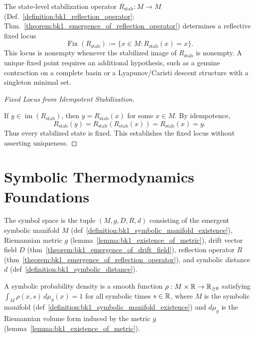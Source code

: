 \begin{corollary}
\label{corollary:bk1_fixed_point}
The state-level stabilization operator \(R_{\mathrm{stab}}:M\to M\)
(Def.~\ref{definition:bk1_reflection_operator};
Thm.~\ref{theorem:bk1_emergence_of_reflection_operator}) determines a reflective
fixed locus
\[
\operatorname{Fix}(R_{\mathrm{stab}})
  := \{x\in M : R_{\mathrm{stab}}(x)=x\}.
\]
This locus is nonempty whenever the stabilized image of \(R_{\mathrm{stab}}\) is
nonempty. A unique fixed point requires an additional hypothesis, such as a
genuine contraction on a complete basin or a Lyapunov/Caristi descent structure
with a singleton minimal set.

\begin{proof}[Fixed Locus from Idempotent Stabilization]
\label{proof:bk1_fixed_point_contraction_stability}
\leavevmode

If \(y\in \operatorname{im}(R_{\mathrm{stab}})\), then \(y=R_{\mathrm{stab}}(x)\)
for some \(x\in M\). By idempotence,
\[
R_{\mathrm{stab}}(y)=R_{\mathrm{stab}}(R_{\mathrm{stab}}(x))
=R_{\mathrm{stab}}(x)=y.
\]
Thus every stabilized state is fixed. This establishes the fixed locus without
asserting uniqueness.
\end{proof}
\end{corollary}
\section{Symbolic Thermodynamics Foundations}
\label{sec:bk1_symbolic_thermodynamics_foundations}

\begin{definition}
\label{definition:bk1_symbol_space}
The symbol space is the tuple $(M, g, D, R, d)$ consisting of the emergent symbolic manifold $M$ (def~\ref{definition:bk1_symbolic_manifold_existence}), Riemannian metric $g$ (lemma~\ref{lemma:bk1_existence_of_metric}), drift vector field $D$ (thm~\ref{theorem:bk1_emergence_of_drift_field}), reflection operator $R$ (thm~\ref{theorem:bk1_emergence_of_reflection_operator}), and symbolic distance $d$ (def~\ref{definition:bk1_symbolic_distance}).
\end{definition}

\begin{definition}
\label{definition:bk1_symbolic_probabilty_density}
A symbolic probability density is a smooth function $\rho: M \times \mathbb{R} \to \mathbb{R}_{\geq 0}$ satisfying $\int_M \rho(x,s) \, d\mu_g(x) = 1$ for all symbolic times $s \in \mathbb{R}$, where $M$ is the symbolic manifold (def~\ref{definition:bk1_symbolic_manifold_existence}) and $d\mu_g$ is the Riemannian volume form induced by the metric $g$ (lemma~\ref{lemma:bk1_existence_of_metric}).
\end{definition}

